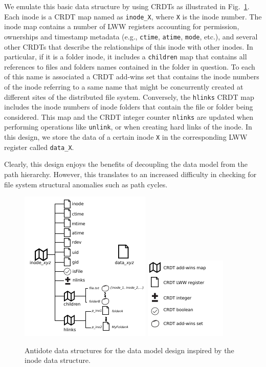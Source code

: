 \documentclass[11pt]{article}
\begin{document}
We emulate this basic data structure by using CRDTs as illustrated in Fig.~\ref{fig:design3}.
Each inode is a CRDT map named as \texttt{inode\_X}, where \texttt{X} is the inode number.
The inode map contains a number of LWW registers accounting for permission, 
ownerships and timestamp metadata (e.g., \texttt{ctime}, \texttt{atime}, \texttt{mode}, etc.),
and several other CRDTs that describe the relationships of this inode with 
other inodes.
In particular, if it is a folder inode, it includes a \texttt{children} map that contains 
all references to files and folders names contained in the folder in question.
To each of this name is associated a CRDT add-wins set that contains the inode numbers
of the inode referring to a same name that might be concurrently created at different sites
of the distributed file system.
Conversely, the \texttt{hlinks} CRDT map includes the inode numbers of inode folders that 
contain the file or folder being considered. 
This map and the CRDT integer counter \texttt{nlinks} are updated when performing operations 
like \texttt{unlink}, or when creating hard links of the inode.
In this design, we store the data of a certain inode \texttt{X} in the corresponding 
LWW register called \texttt{data\_X}.

Clearly, this design enjoys the benefits of decoupling the data model 
from the path hierarchy.
However, this translates to an increased difficulty in checking for 
file system structural anomalies such as path cycles.

\begin{figure}
	\centering
	\includegraphics[scale=1.5]{design-3.pdf}
	\includegraphics[scale=1.0]{legend.pdf}
	\caption{Antidote data structures for the data model design 
		inspired by the inode data structure.}
	\label{fig:design3}
\end{figure}
\end{document}
